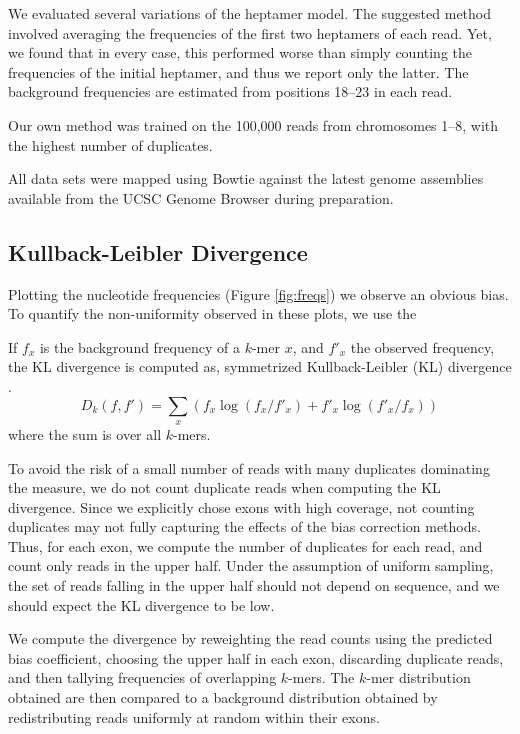 \documentclass{bioinfo}
\begin{document}
We evaluated several variations of the heptamer model. The suggested method
involved averaging the frequencies of the first two heptamers of each read. Yet,
we found that in every case, this performed worse than simply counting the
frequencies of the initial heptamer, and thus we report only the latter. The
background frequencies are estimated from positions 18--23 in each read.

Our own method was trained on the 100,000 reads from chromosomes 1--8, with the
highest number of duplicates.

All data sets were mapped using Bowtie \citep{Langmead2009} against the latest
genome assemblies available from the UCSC Genome Browser \citep{Karolchik2008}
during preparation.



\subsection{Kullback-Leibler Divergence}

Plotting the nucleotide frequencies (Figure  \ref{fig:freqs}) we observe an
obvious bias. To quantify the non-uniformity observed in these plots, we use the

If $f_x$ is the background frequency of a $k$-mer $x$, and $f'_x$ the observed
frequency, the KL divergence is computed as, symmetrized Kullback-Leibler (KL)
divergence \citep{Kullback1951}.
$$D_k( f, f' ) = \sum_{x} \left( f_x \log( f_x / f'_x ) + f'_x \log( f'_x / f_x) \right)$$
where the sum is over all $k$-mers.


To avoid the risk of a small number of reads with many duplicates dominating the
measure, we do not count duplicate reads when computing the KL divergence. Since we
explicitly chose exons with high coverage, not counting duplicates may not
fully capturing the effects of the bias correction methods. Thus, for each exon,
we compute the number of duplicates for each read, and count only reads in the
upper half. Under the assumption of uniform sampling, the set of reads falling
in the upper half should not depend on sequence, and we should expect the KL
divergence to be low.

We compute the divergence by reweighting the read counts using the predicted
bias coefficient, choosing the upper half in each exon, discarding duplicate
reads, and then tallying frequencies of overlapping $k$-mers. The $k$-mer
distribution obtained are then compared to a background distribution obtained by
redistributing reads uniformly at random within their exons.
\end{document}
